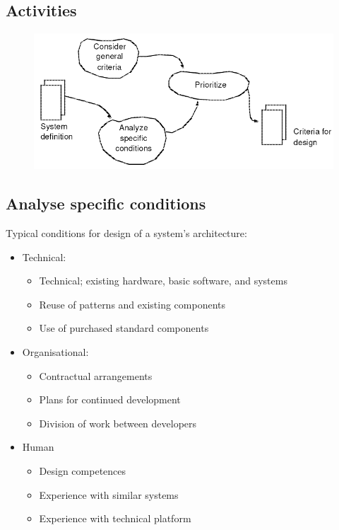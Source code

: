 \subsection{Activities}

\begin{figure}[H]
    \centering
    \includegraphics[width=.65\textwidth]{figures/criteriaactivities.png}
\end{figure}

\subsection{Analyse specific conditions}
Typical conditions for design of a system's architecture:
\begin{itemize}
    \item Technical:
    \begin{itemize}
        \item Technical; existing hardware, basic software, and systems
        \item Reuse of patterns and existing components
        \item Use of purchased standard components
    \end{itemize}
    \item Organisational:
    \begin{itemize}
        \item Contractual arrangements
        \item Plans for continued development
        \item Division of work between developers
    \end{itemize}
    \item Human
    \begin{itemize}
        \item Design competences
        \item Experience with similar systems
        \item Experience with technical platform
    \end{itemize}
\end{itemize}

